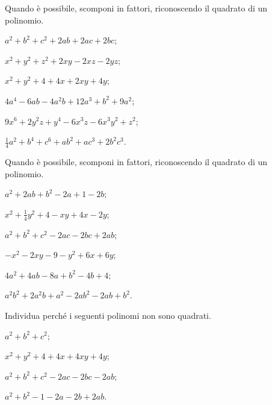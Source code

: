 \begin{esercizio}
\label{ese:13.33}
Quando è possibile, scomponi in fattori, riconoscendo il quadrato di un polinomio.
\begin{multicols}{2}
\begin{enumeratea}
 \item $a^{2}+b^{2}+c^{2}+2ab+2ac+2bc$;
 \item $x^{2}+y^{2}+z^{2}+2xy-2xz-2yz$;
 \item $x^{2}+y^{2}+4+4x+2xy+4y$;
 \item $4a^{4}-6{ab}-4a^{2}b+12a^{3}+b^{2}+9a^{2}$;
 \item $9x^{6}+2y^{2}z+y^{4}-6x^{3}z-6x^{3}y^{2}+z^{2}$;
 \item $\frac{1}{4}a^{2}+b^{4}+c^{6}+ab^{2}+{ac}^{3}+2b^{2}c^{3}$.
\end{enumeratea}
\end{multicols}
\end{esercizio}

\begin{esercizio}
\label{ese:13.34}
Quando è possibile, scomponi in fattori, riconoscendo il quadrato di un polinomio.
\begin{multicols}{2}
\begin{enumeratea}
 \item $a^{2}+2ab+b^{2}-2a+1-2b$;
 \item $x^{2}+\frac{1}{4}y^{2}+4-xy+4x-2y$;
 \item $a^{2}+b^{2}+c^{2}-2ac-2bc+2ab$;
 \item $-x^{2}-2xy-9-y^{2}+6x+6y$;
 \item $4a^{2}+4ab-8a+b^{2}-4b+4$;
 \item $a^{2}b^{2}+2a^{2}b+a^{2}-2ab^{2}-2ab+b^{2}$.
\end{enumeratea}
\end{multicols}
\end{esercizio}

\begin{esercizio}
\label{ese:13.35}
Individua perché i seguenti polinomi non sono quadrati.
\begin{multicols}{2}
\begin{enumeratea}
 \item $a^{2}+b^{2}+c^{2}$; %
 \item $x^{2}+y^{2}+4+4x+4xy+4y$; %
 \item $a^{2}+b^{2}+c^{2}-2ac-2bc-2ab$; %
 \item $a^{2}+b^{2}-1-2a-2b+2ab$. %
\end{enumeratea}
\end{multicols}
\end{esercizio}

